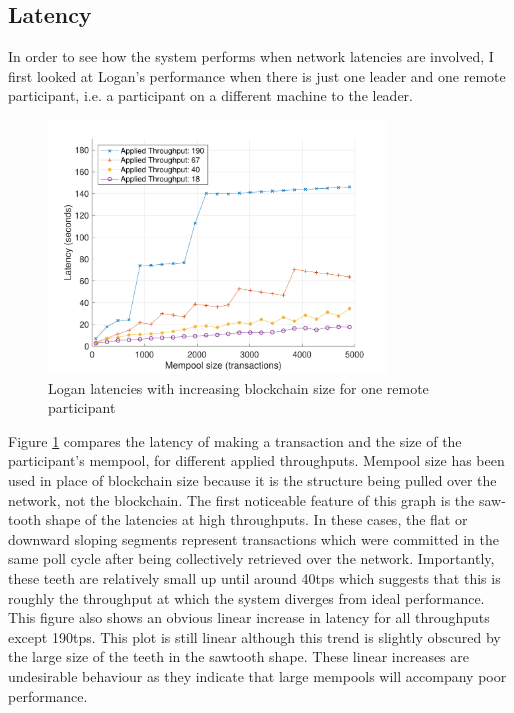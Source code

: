 \documentclass[12pt,a4paper,twoside,openright]{report}
\begin{document}
	\subsection{Latency}
	In order to see how the system performs when network latencies are involved, I first looked at Logan's performance when there is just one leader and one remote participant, i.e. a participant on a different machine to the leader.
	\begin{figure}
		\centering
		\includegraphics[width=0.8\textwidth]{figs/latencies_sizes_throughputs.pdf}
		\caption{Logan latencies with increasing blockchain size for one remote participant}
		\label{figs:remlatencysize}
	\end{figure} 
	Figure \ref{figs:remlatencysize} compares the latency of making a transaction and the size of the participant's mempool, for different applied throughputs.
	Mempool size has been used in place of blockchain size because it is the structure being pulled over the network, not the blockchain.
	The first noticeable feature of this graph is the saw-tooth shape of the latencies at high throughputs.
	In these cases, the flat or downward sloping segments represent transactions which were committed in the same poll cycle after being collectively retrieved over the network.
	Importantly, these teeth are relatively small up until around 40tps which suggests that this is roughly the throughput at which the system diverges from ideal performance.
	This figure also shows an obvious linear increase in latency for all throughputs except 190tps. 
	This plot is still linear although this trend is slightly obscured by the large size of the teeth in the sawtooth shape.
	These linear increases are undesirable behaviour as they indicate that large mempools will accompany poor performance.\\
	
\end{document}
